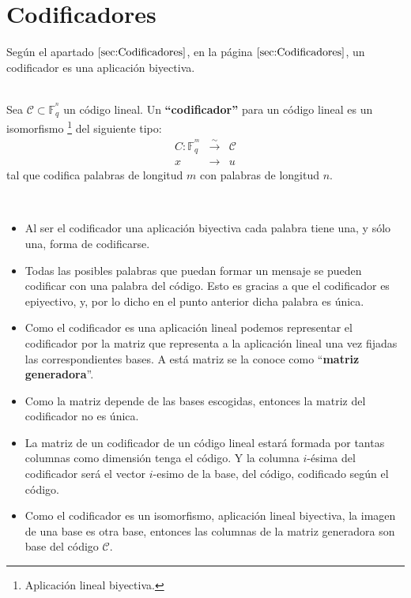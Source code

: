 %
%

\section{Codificadores}

Seg\'un el apartado $\ref{sec:Codificadores}$, en la p\'agina
$\pageref{sec:Codificadores}$, un codificador es una aplicaci\'on biyectiva.

\begin{definicion}
\ \\
Sea $\mathcal{C}\subset \mathbb{F}^{^n}_q$ un c\'odigo lineal. Un
\textbf{``codificador''} para un c\'odigo lineal es un isomorfismo%
\footnote{Aplicaci\'on lineal biyectiva.} del siguiente tipo:
\begin{eqnarray*}
C:\mathbb{F}^{^m}_q&\stackrel{\sim}\longrightarrow&\mathcal{C}\\
x&\longrightarrow& u
\end{eqnarray*}
tal que codifica palabras de longitud $m$ con palabras de longitud $n$.
\end{definicion}
\begin{observacion}
\ \\
\begin{itemize}
\item Al ser el codificador una aplicaci\'on biyectiva cada palabra tiene una, y
s\'olo una, forma de codificarse. 
\item Todas las posibles palabras que puedan formar un mensaje se pueden
codificar con una palabra del c\'odigo. Esto es gracias a que el codificador es
epiyectivo, y, por lo dicho en el punto anterior dicha palabra es \'unica.
\item Como el codificador es una aplicaci\'on lineal podemos representar el
codificador por la matriz que representa a la aplicaci\'on lineal una vez
fijadas las correspondientes bases. A est\'a matriz se la conoce como
``\textbf{matriz generadora}''.
\item Como la matriz depende de las bases escogidas, entonces la matriz del
codificador no es \'unica.
\item La matriz de un codificador de un c\'odigo lineal estar\'a formada por
tantas columnas como dimensi\'on tenga el c\'odigo. Y la columna $i$-\'esima
del codificador ser\'a el vector $i$-esimo de la base, del c\'odigo, 
codificado seg\'un el c\'odigo.
\item Como el codificador es un isomorfismo, aplicaci\'on lineal biyectiva, la
imagen de una base es otra base, entonces las columnas de la matriz generadora
son base del c\'odigo $\mathcal{C}$.
\end{itemize}
\end{observacion}

